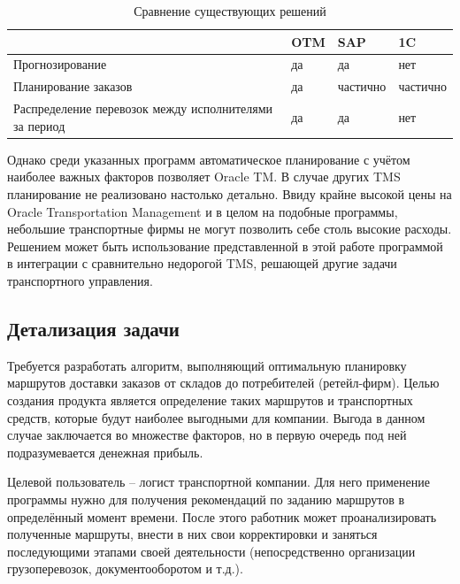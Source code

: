 	\begin{table}[h]
		\begin{center}
			\caption{Сравнение существующих решений}
			\label{cmp_table}
			\begin{tabular}{| p{5cm} | p{2.5cm} | p{2.5cm} | p{2.5cm} |}
				\hline
				\backslashbox{\textbf{Функция}}{\textbf{TMS}} &
				OTM &
				SAP &
				1C \\
				
				\hline
				Прогнозирование & 
				да &
				да &
				нет \\
				 
				\hline
				Планирование заказов &
				да &
				частично &
				частично \\
				
				\hline
				Распределение перевозок между исполнителями за период &
				да &
				да &
				нет \\
				
				\hline
			\end{tabular}
		\end{center}
	\end{table}
	
	Однако среди указанных программ автоматическое планирование с учётом наиболее важных факторов позволяет Oracle TM. В случае других TMS планирование не реализовано настолько детально. Ввиду крайне высокой цены\cite{subj:tms_cmp} на Oracle Transportation Management и в целом на подобные программы, небольшие транспортные фирмы не могут позволить себе столь высокие расходы. Решением может быть использование представленной в этой работе программой в интеграции с сравнительно недорогой TMS, решающей другие задачи транспортного управления.
	

\subsection{Детализация задачи}
	Требуется разработать алгоритм, выполняющий оптимальную планировку маршрутов доставки заказов от складов до потребителей (ретейл-фирм). Целью создания продукта является определение таких маршрутов и транспортных средств, которые будут наиболее выгодными для компании. Выгода в данном случае заключается во множестве факторов, но в первую очередь под ней подразумевается денежная прибыль.
	
	Целевой пользователь -- логист транспортной компании. Для него применение программы нужно для получения рекомендаций по заданию маршрутов в определённый момент времени. После этого работник может проанализировать полученные маршруты, внести в них свои корректировки и заняться последующими этапами своей деятельности (непосредственно организации грузоперевозок, документооборотом и т.д.).
	
